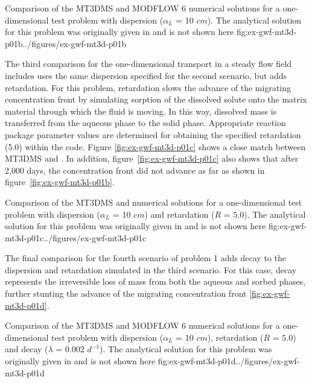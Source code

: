 \begin{StandardFigure}
	{Comparison of the MT3DMS and MODFLOW 6 numerical solutions for a one-dimensional test problem with dispersion ($\alpha_L$ = 10 $cm$).  The analytical solution for this problem was originally given in \cite{vanGenuchtenAlves1982} and is not shown here}
	{fig:ex-gwf-mt3d-p01b}{../figures/ex-gwf-mt3d-p01b}
\end{StandardFigure}

The third comparison for the one-dimensional transport in a steady flow field includes uses the same dispersion specified for the second scenario, but adds retardation.  For this problem, retardation slows the advance of the migrating concentration front by simulating sorption of the dissolved solute onto the matrix material through which the fluid is moving. In this way, dissolved mass is transferred from the aqueous phase to the solid phase. Appropriate reaction package parameter values are determined for obtaining the specified retardation (5.0) within the code. Figure \ref{fig:ex-gwf-mt3d-p01c} shows a close match between MT3DMS and \mf. In addition, figure~\ref{fig:ex-gwf-mt3d-p01c} also shows that after 2,000 days, the concentration front did not advance as far as shown in figure~\ref{fig:ex-gwf-mt3d-p01b}.

\begin{StandardFigure}
	{Comparison of the MT3DMS and \mf numerical solutions for a one-dimensional test problem with dispersion ($\alpha_L$ = 10 $cm$) and retardation ($R$ = $5.0$). The analytical solution for this problem was originally given in \cite{vanGenuchtenAlves1982} and is not shown here}
	{fig:ex-gwf-mt3d-p01c}{../figures/ex-gwf-mt3d-p01c}
\end{StandardFigure}

The final comparison for the fourth scenario of problem 1 adds decay to the dispersion and retardation simulated in the third scenario. For this case, decay represents the irreversible loss of mass from both the aqueous and sorbed phases, further stunting the advance of the migrating concentration front \ref{fig:ex-gwf-mt3d-p01d}.  

\begin{StandardFigure}
	{Comparison of the MT3DMS and MODFLOW 6 numerical solutions for a one-dimensional test problem with dispersion ($\alpha_L$ = 10 $cm$), retardation ($R$ = $5.0$) and decay ($\lambda$ = 0.002 $d^{-1}$).  The analytical solution for this problem was originally given in \cite{vanGenuchtenAlves1982} and is not shown here}
	{fig:ex-gwf-mt3d-p01d}{../figures/ex-gwf-mt3d-p01d}
\end{StandardFigure}



